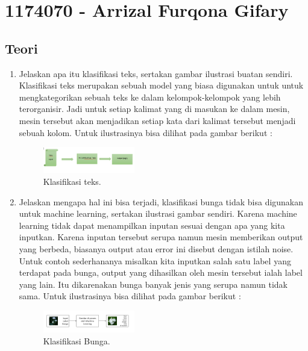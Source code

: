 \section{1174070 - Arrizal Furqona Gifary}
\subsection{Teori}
\begin{enumerate}

	\item Jelaskan apa itu klasifikasi teks, sertakan gambar ilustrasi buatan sendiri.
	\hfill\break
	Klasifikasi teks merupakan sebuah model yang biasa digunakan untuk untuk mengkategorikan sebuah teks ke dalam kelompok-kelompok yang lebih terorganisir. Jadi untuk setiap kalimat yang di masukan ke dalam mesin, mesin tersebut akan menjadikan setiap kata dari kalimat tersebut menjadi sebuah kolom. Untuk ilustrasinya bisa dilihat pada gambar berikut : 

	\begin{figure}[H]
	\centering
		\includegraphics[width=4cm]{figures/1174070/4/materi/1.PNG}
		\caption{Klasifikasi teks.}
	\end{figure}

	\item Jelaskan mengapa hal ini bisa terjadi, klasifikasi bunga tidak bisa digunakan untuk machine learning, sertakan ilustrasi gambar sendiri.
	\hfill\break
	Karena machine learning tidak dapat menampilkan inputan sesuai dengan apa yang kita inputkan. Karena inputan tersebut serupa namun mesin memberikan output yang berbeda, biasanya output atau error ini disebut dengan istilah noise. Untuk contoh sederhananya misalkan kita inputkan salah satu label yang terdapat pada bunga, output yang dihasilkan oleh mesin tersebut ialah label yang lain. Itu dikarenakan bunga banyak jenis yang serupa namun tidak sama. Untuk ilustrasinya bisa dilihat pada gambar berikut : 

	\begin{figure}[H]
	\centering
		\includegraphics[width=4cm]{figures/1174070/4/materi/2.PNG}
		\caption{Klasifikasi Bunga.}
	\end{figure}
	

\end{enumerate}
